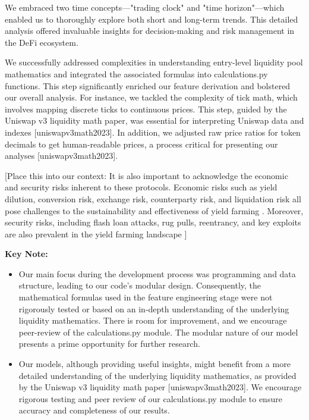 \documentclass{article}
\begin{document}
We embraced two time concepts—"trading clock" and "time horizon"—which enabled us to thoroughly explore both short and long-term trends. This detailed analysis offered invaluable insights for decision-making and risk management in the DeFi ecosystem\cite{defi-characterisation-2023}.

We successfully addressed complexities in understanding entry-level liquidity pool mathematics and integrated the associated formulas into calculations.py functions. This step significantly enriched our feature derivation and bolstered our overall analysis\cite{uniswapv3math2023,impermanentloss2023}.
For instance, we tackled the complexity of tick math, which involves mapping discrete ticks to continuous prices. This step, guided by the Uniswap v3 liquidity math paper, was essential for interpreting Uniswap data and indexes [uniswapv3math2023]. In addition, we adjusted raw price ratios for token decimals to get human-readable prices, a process critical for presenting our analyses [uniswapv3math2023].

[Place this into our context: It is also important to acknowledge the economic and security risks inherent to these protocols. Economic risks such as yield dilution, conversion risk, exchange risk, counterparty risk, and liquidation risk all pose challenges to the sustainability and effectiveness of yield farming \cite{yield_farming_protocols}. Moreover, security risks, including flash loan attacks, rug pulls, reentrancy, and key exploits are also prevalent in the yield farming landscape \cite{yield_farming_protocols}]

\textbf{Key Note:}
\begin{itemize}
\item Our main focus during the development process was programming and data structure, leading to our code's modular design. Consequently, the mathematical formulas used in the feature engineering stage were not rigorously tested or based on an in-depth understanding of the underlying liquidity mathematics. There is room for improvement, and we encourage peer-review of the calculations.py module. The modular nature of our model presents a prime opportunity for further research\cite{uniswapv3math2023,defi2023uniswap}.
\item Our models, although providing useful insights, might benefit from a more detailed understanding of the underlying liquidity mathematics, as provided by the Uniswap v3 liquidity math paper [uniswapv3math2023]. We encourage rigorous testing and peer review of our calculations.py module to ensure accuracy and completeness of our results\cite{uniswapv3math2023,defi2023uniswap}.
\end{itemize}
\end{document}
